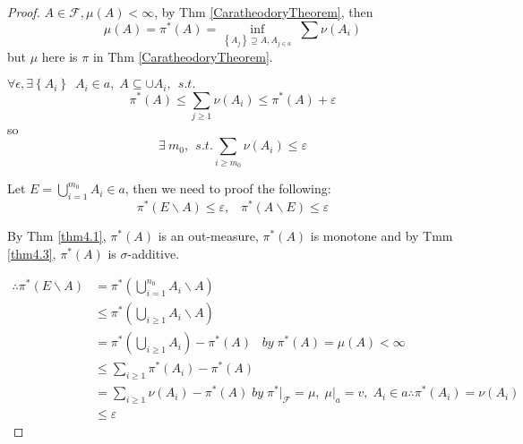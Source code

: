 \begin{proof}
	$  A \in \mathcal{F}, \mu(A) < \infty $,  by Thm \ref{CaratheodoryTheorem}, then 
	\begin{equation}
	\mu \left( A \right) = {\pi ^*}\left( A \right) = \mathop {\inf }\limits_{\left\{ {{A_j}} \right\} \supseteq A,{A_{j \in a}}} \;\sum {\nu \left( {{A_i}} \right)} 
	\label{eq9.2}
	\end{equation}
	but $ \mu $ here  is $ \pi $ in Thm \ref{CaratheodoryTheorem}.
	
	$ \forall \epsilon, \exists \left\{ {{A_i}} \right\}\ \;{A_i} \in a,\;A \subseteq  \cup {A_i}, \ \ s.t. $
	\begin{equation}
	{\pi ^*}\left( A \right) \leqslant \sum\limits_{j \geqslant 1} {\nu \left( {{A_i}} \right)}  \leqslant {\pi ^*}\left( A \right) + \varepsilon 
	\label{eq9.3}
	\end{equation}
	so 
	\begin{equation}
	\exists \ m_{0} , \ \ s.t. \sum\limits_{i \geqslant {m_0}} {\nu \left( {{A_i}} \right)}  \leqslant \varepsilon
	\label{eq9.4}
	\end{equation}
	
	Let $ E = \bigcup\limits_{i = 1}^{{m_0}} {{A_i}}  \in a $, then we need to proof the following:
	\begin{equation}
	{\pi ^*}\left( {E\backslash A} \right) \leqslant \varepsilon, \;\;\;{\pi ^*}\left( {A\backslash E} \right) \leqslant \varepsilon 
	\label{eq9.5}
	\end{equation}
	
	By Thm \ref{thm4.1}, ${\pi ^*}\left( A \right)$ is an out-measure, ${\pi ^*}\left( A \right)$ is monotone and by Tmm \ref{thm4.3}, ${\pi ^*}\left( A \right)$ is  $ \sigma $-additive. 
	
	\begin{equation}
	\begin{split}
	\therefore {\pi ^*}\left( {E\backslash A} \right) & = {\pi ^*}\left( {\bigcup\limits_{i = 1}^{{n_0}} {{A_i}} \backslash A} \right)\\
													  & \leqslant {\pi ^*}\left( {\bigcup\limits_{i \geqslant 1} {{A_i}\backslash A} } \right)\\
													  &  = {\pi ^*}\left( {\bigcup\limits_{i \geqslant 1} {{A_i}} } \right) - {\pi ^*}\left( A \right)\;\;\;by\;{\pi ^*}\left( A \right) = \mu \left( A \right) < \infty \\
													  & \leqslant \sum\limits_{i \geqslant 1} {{\pi ^*}\left( {{A_i}} \right)}  - {\pi ^*}\left( A \right)\\
													  & =  \sum\limits_{i \geqslant 1} {\nu \left( {{A_i}} \right)}  - {\pi ^*}\left( A \right)\;by\;{\pi ^*}{|_{\mathcal{F}}} = \mu ,\;\mu {|_a} = v,\;{A_i} \in a\therefore {\pi ^*}\left( {{A_i}} \right) = \nu \left( {{A_i}} \right)\\
													  & \le  \varepsilon
	\end{split}
	\label{eq9.6}
	\end{equation}
	

\end{proof}
